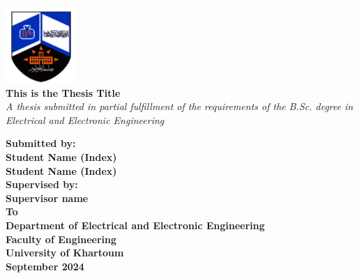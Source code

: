 \documentclass[12pt,a4paper]{report}
\begin{document}
\begin{titlepage}
    \begin{center}
        \vspace*{-0.05cm} %
        \includegraphics[width=0.2\textwidth]{Figures/Fig:logo.jpg}\\[1cm]  %
        {\Large\textbf{This is the Thesis Title}}\\[0.5cm]
        {\large \textit{A thesis submitted in partial fulfillment of the requirements of the B.Sc. degree in Electrical and Electronic Engineering}}\\[1.5cm]
        \begin{spacing}{1.5}  %
        \textbf{Submitted by:}\\[0.5cm]
        {\textbf{Student Name (Index)}}\\
        {\textbf{Student Name (Index)}}\\[1cm]
        \textbf{Supervised by:}\\[0.5cm]
        {\textbf{Supervisor name}}\\[1cm]
        \textbf{To}\\[0.5cm]
        {\textbf{Department of Electrical and Electronic Engineering}}\\
        {\textbf{Faculty of Engineering}}\\
        {\textbf{University of Khartoum}}\\[1.5cm]
        \textbf{September 2024}
        \end{spacing}
    \end{center}
\end{titlepage}






\listoftables
\newpage
\listoffigures
\newpage
\tableofcontents






 

\end{document}
